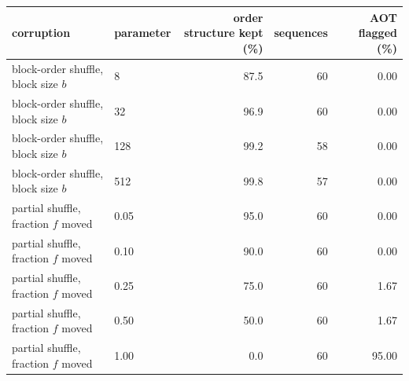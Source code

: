 \begin{tabular}{llrrr}
\toprule
corruption & parameter & order structure kept (\%) & sequences & AOT flagged (\%) \\
\midrule
block-order shuffle, block size $b$ & 8 & 87.5 & 60 & 0.00 \\
block-order shuffle, block size $b$ & 32 & 96.9 & 60 & 0.00 \\
block-order shuffle, block size $b$ & 128 & 99.2 & 58 & 0.00 \\
block-order shuffle, block size $b$ & 512 & 99.8 & 57 & 0.00 \\
partial shuffle, fraction $f$ moved & 0.05 & 95.0 & 60 & 0.00 \\
partial shuffle, fraction $f$ moved & 0.10 & 90.0 & 60 & 0.00 \\
partial shuffle, fraction $f$ moved & 0.25 & 75.0 & 60 & 1.67 \\
partial shuffle, fraction $f$ moved & 0.50 & 50.0 & 60 & 1.67 \\
partial shuffle, fraction $f$ moved & 1.00 & 0.0 & 60 & 95.00 \\
\bottomrule
\end{tabular}